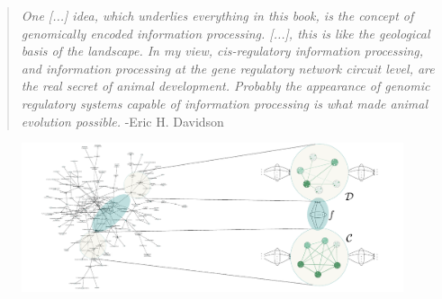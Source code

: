 \begin{frame}
\begin{quotation}
{\it One [...] idea, which underlies everything in this book, is the concept
of genomically encoded information processing. [...],
this is like the geological basis of the landscape. In my view, cis-regulatory information processing, and information processing at the gene regulatory network circuit level, are the real secret of animal development. Probably the appearance of genomic regulatory systems capable of information processing is what made animal evolution possible.} -Eric H. Davidson \cite{Davidson2006a}
\end{quotation}
\end{frame}

\begin{frame}
\begin{figure}
\noindent\includegraphics[width=1.0\framewidth]{fig/biograph.pdf}
\label{fig:biograph}
\end{figure}
\end{frame}